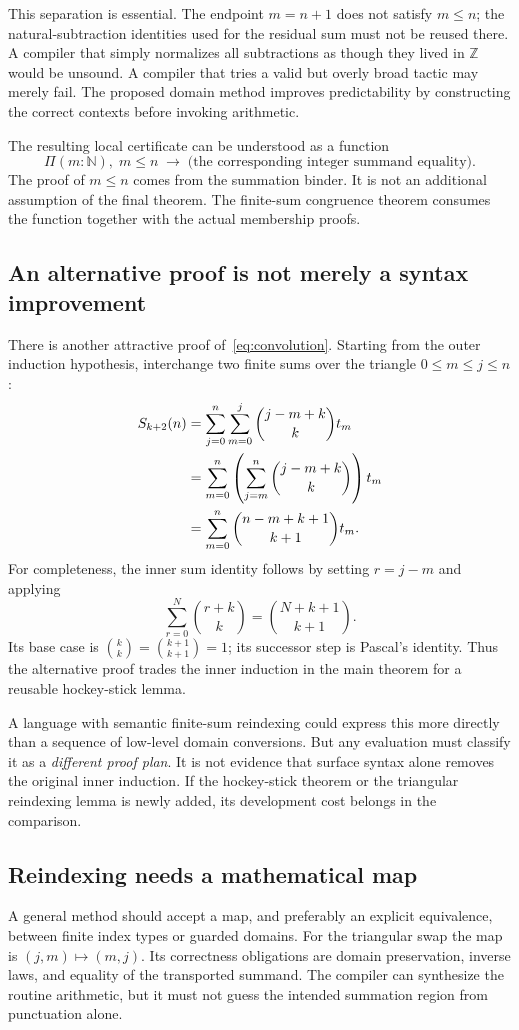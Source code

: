 \documentclass[11pt,letterpaper]{article}
\theoremstyle{definition}
\theoremstyle{remark}
\newcommand{\N}{\mathbb N}
\newcommand{\Z}{\mathbb Z}
\newcommand{\code}[1]{\texttt{\detokenize{#1}}}
\begin{document}
This separation is essential. The endpoint $m=n+1$ does not satisfy $m\le n$; the natural-subtraction identities used for the residual sum must not be reused there. A compiler that simply normalizes all subtractions as though they lived in $\Z$ would be unsound. A compiler that tries a valid but overly broad tactic may merely fail. The proposed domain method improves predictability by constructing the correct contexts before invoking arithmetic.

The resulting local certificate can be understood as a function
\[
 \Pi(m:\N),\;m\le n\;\to\;
 \bigl(\text{the corresponding integer summand equality}\bigr).
\]
The proof of $m\le n$ comes from the summation binder. It is not an additional assumption of the final theorem. The finite-sum congruence theorem consumes the function together with the actual membership proofs.

\subsection{An alternative proof is not merely a syntax improvement}
There is another attractive proof of~\eqref{eq:convolution}. Starting from the outer induction hypothesis, interchange two finite sums over the triangle $0\le m\le j\le n$:
\begin{align}
 S_{k+2}(n)
 &=\sum_{j=0}^n\sum_{m=0}^j\binom{j-m+k}{k}t_m\notag\\
 &=\sum_{m=0}^n\left(\sum_{j=m}^n\binom{j-m+k}{k}\right)t_m\notag\\
 &=\sum_{m=0}^n\binom{n-m+k+1}{k+1}t_m.
 \label{eq:hockey-proof}
\end{align}
For completeness, the inner sum identity follows by setting $r=j-m$ and applying
\[
 \sum_{r=0}^{N}\binom{r+k}{k}=\binom{N+k+1}{k+1}.
\]
Its base case is $\binom{k}{k}=\binom{k+1}{k+1}=1$; its successor step is Pascal's identity. Thus the alternative proof trades the inner induction in the main theorem for a reusable hockey-stick lemma.

A language with semantic finite-sum reindexing could express this more directly than a sequence of low-level domain conversions. But any evaluation must classify it as a \emph{different proof plan}. It is not evidence that surface syntax alone removes the original inner induction. If the hockey-stick theorem or the triangular reindexing lemma is newly added, its development cost belongs in the comparison.

\subsection{Reindexing needs a mathematical map}
A general \code{reindex} method should accept a map, and preferably an explicit equivalence, between finite index types or guarded domains. For the triangular swap the map is $(j,m)\mapsto(m,j)$. Its correctness obligations are domain preservation, inverse laws, and equality of the transported summand. The compiler can synthesize the routine arithmetic, but it must not guess the intended summation region from punctuation alone.
\end{document}

